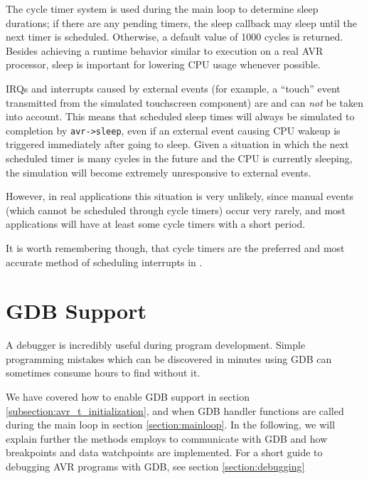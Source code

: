 The cycle timer system is used during the main loop to determine sleep durations;
if there are any pending timers, the sleep callback may sleep until the next timer
is scheduled. Otherwise, a default value of 1000 cycles is returned.
Besides achieving a runtime behavior similar to execution on a real \ac{AVR}
processor, sleep is important for lowering \simavr \ac{CPU} usage whenever possible.

\acp{IRQ} and interrupts caused by external events (for example, a ``touch'' event transmitted
from the simulated touchscreen component) are and can \emph{not} be taken into
account.
This means that scheduled sleep times will always be simulated to completion by
\lstinline|avr->sleep|, even if an external event causing \ac{CPU} wakeup is
triggered immediately after going to sleep.
Given a situation in which the next scheduled timer is many cycles in the future
and the \ac{CPU} is currently sleeping, the simulation will become extremely
unresponsive to external events.

However, in real applications this situation is very unlikely, since
manual events (which cannot be scheduled through cycle timers) occur very rarely,
and most applications will have at least some cycle timers with a short period.

It is worth remembering though, that cycle timers are the preferred and most
accurate method of scheduling interrupts in \simavr.


\section{\acf{GDB} Support} \label{section:gdb_support}

A debugger is incredibly useful during program development. Simple programming mistakes
which can be discovered in minutes using \ac{GDB} can sometimes consume hours
to find without it.

We have covered how to enable \ac{GDB} support in section
\ref{subsection:avr_t_initialization}, and when \ac{GDB} handler functions are
called during the main loop in section \ref{section:mainloop}. In the following,
we will explain further the methods \simavr employs to communicate with
\ac{GDB} and how breakpoints and data watchpoints are implemented. For
a short guide to debugging \ac{AVR} programs with \ac{GDB}, see section
\ref{section:debugging}

